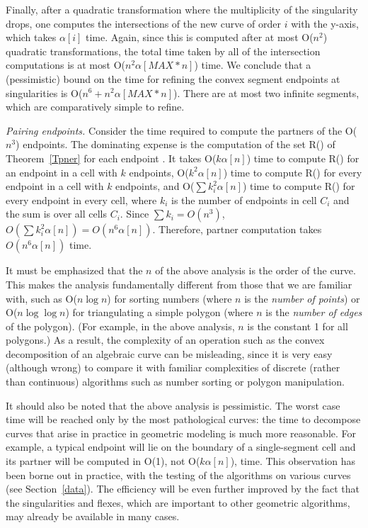 Finally, after a quadratic transformation where the multiplicity of the singularity 
drops, one computes the intersections of the new curve of order $i$ with the y-axis, 
which takes $\alpha[i]$ time.
Again, since this is computed after at most O($n^{2}$) quadratic transformations,
the total time taken by all of the intersection computations is at most 
O($n^{2} \alpha[MAX * n]$) time.
We conclude that a (pessimistic) bound on the time for refining the
convex segment endpoints at singularities is O($n^{6} + n^{2} \alpha[MAX * n]$).
There are at most two infinite segments, which are comparatively simple to refine.

{\em Pairing endpoints.}
%
Consider the time required to compute the partners of the O($n^{3}$) endpoints.
The dominating expense is the computation of the set R(\wo) of 
Theorem~\ref{Tpner} for each endpoint \wo.
It takes O($k\alpha[n]$) time to compute R(\wo) for an endpoint in a cell
with $k$ endpoints, O($k^{2}\alpha[n]$) time to compute R(\wo) for every 
endpoint in a cell with $k$ endpoints, and O($\sum k_{i}^{2}\alpha[n]$)
time to compute R(\wo) for every endpoint in every cell, where $k_{i}$ is the
number of endpoints in cell $C_{i}$ and the sum is over all cells $C_{i}$.
Since $\sum k_{i} = O(n^{3})$, $O(\sum k_{i}^{2}\alpha[n]) = O(n^{6}\alpha[n])$.
Therefore, partner computation takes $O(n^{6}\alpha[n])$ time.
\QED

It must be emphasized that the $n$ of the above analysis is the order of the curve.
This makes the analysis fundamentally different from those that we
are familiar with, such as O($n \log n$) for sorting numbers (where
$n$ is the {\em number of points}) or O($n \log \log n$) for triangulating a simple
polygon (where $n$ is the {\em number of edges} of the polygon).
(For example, in the above analysis, $n$ is the constant 1 for all polygons.)
As a result, the complexity of an operation such as the convex decomposition of an
algebraic curve can be misleading, since it is very easy (although wrong) to 
compare it with familiar complexities of discrete (rather than continuous) algorithms 
such as number sorting or polygon manipulation.

It should also be noted that the above analysis is pessimistic.
The worst case time will be reached only by the most pathological curves: the time to 
decompose curves that arise in practice in geometric modeling is much more reasonable.
For example, a typical endpoint will lie on the boundary of a single-segment cell and its 
partner will be computed in O(1), not O($k \alpha[n]$), time.
This observation has been borne out in practice, with the testing of the algorithms on
various curves (see Section~\ref{data}).
The efficiency will be even further improved by the fact that the singularities and 
flexes, which are important to other geometric algorithms, may already be available in 
many cases.

